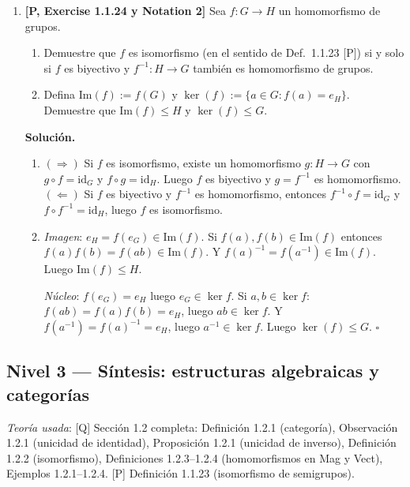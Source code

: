 \begin{enumerate}[label=\textbf{2.\arabic*.}]
\item \textbf{[P, Exercise 1.1.24 y Notation 2]} Sea \(f:G \to H\) un
homomorfismo de grupos.
\begin{enumerate}[label=\alph*)]
    \item Demuestre que \(f\) es isomorfismo (en el sentido de Def.\ 1.1.23 [P])
    si y solo si \(f\) es biyectivo y \(f^{-1}:H\to G\) también es homomorfismo
    de grupos.
    \item Defina \(\mathrm{Im}(f) := f(G)\) y \(\ker(f) := \{a \in G : f(a)=e_H\}\).
    Demuestre que \(\mathrm{Im}(f) \leq H\) y \(\ker(f) \leq G\).
\end{enumerate}

\textbf{Solución.}
\begin{enumerate}[label=\alph*)]
    \item \((\Rightarrow)\) Si \(f\) es isomorfismo, existe un homomorfismo
    \(g:H\to G\) con \(g\circ f=\mathrm{id}_G\) y \(f\circ g=\mathrm{id}_H\).
    Luego \(f\) es biyectivo y \(g = f^{-1}\) es homomorfismo.
    \((\Leftarrow)\) Si \(f\) es biyectivo y \(f^{-1}\) es homomorfismo, entonces
    \(f^{-1}\circ f = \mathrm{id}_G\) y \(f\circ f^{-1}=\mathrm{id}_H\), luego
    \(f\) es isomorfismo.

    \item \textit{Imagen}: \(e_H = f(e_G) \in \mathrm{Im}(f)\). Si
    \(f(a),f(b)\in\mathrm{Im}(f)\) entonces \(f(a)f(b)=f(ab)\in\mathrm{Im}(f)\).
    Y \(f(a)^{-1}=f(a^{-1})\in\mathrm{Im}(f)\). Luego \(\mathrm{Im}(f) \leq H\).

    \textit{Núcleo}: \(f(e_G)=e_H\) luego \(e_G \in \ker f\). Si \(a,b\in\ker f\):
    \(f(ab)=f(a)f(b)=e_H\), luego \(ab\in\ker f\). Y \(f(a^{-1})=f(a)^{-1}=e_H\),
    luego \(a^{-1}\in\ker f\). Luego \(\ker(f) \leq G\). \hfill\(\square\)
\end{enumerate}

\end{enumerate}

\subsection*{Nivel 3 --- Síntesis: estructuras algebraicas y categorías}

\textit{Teoría usada}: [Q] Sección 1.2 completa: Definición 1.2.1 (categoría),
Observación 1.2.1 (unicidad de identidad), Proposición 1.2.1 (unicidad de inverso),
Definición 1.2.2 (isomorfismo), Definiciones 1.2.3--1.2.4 (homomorfismos en Mag y
Vect), Ejemplos 1.2.1--1.2.4. [P] Definición 1.1.23 (isomorfismo de semigrupos).

